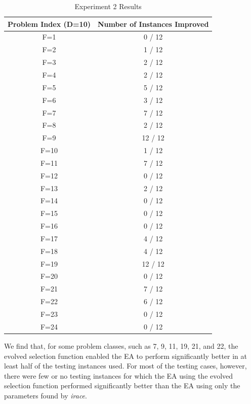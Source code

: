 \documentclass[sigconf]{acmart}
\begin{document}
\begin{table}
	\centering
	\caption{Experiment 2 Results}
	\label{tab:experiment2results}
	\begin{tabular}{c|c}
		\toprule
		Problem Index (D=10) & Number of Instances Improved \\
		\midrule
		F=1 & 0 / 12 \\
		\hline
		F=2 & 1 / 12 \\
		\hline
		F=3 & 2 / 12 \\
		\hline
		F=4 & 2 / 12 \\
		\hline
		F=5 & 5 / 12 \\
		\hline
		F=6 & 3 / 12 \\
		\hline
		F=7 & 7 / 12 \\
		\hline
		F=8 & 2 / 12 \\
		\hline
		F=9 & 12 / 12 \\
		\hline
		F=10 & 1 / 12 \\
		\hline
		F=11 & 7 / 12 \\
		\hline
		F=12 & 0 / 12 \\
		\hline
		F=13 & 2 / 12 \\
		\hline
		F=14 & 0 / 12 \\
		\hline
		F=15 & 0 / 12 \\
		\hline
		F=16 & 0 / 12 \\
		\hline
		F=17 & 4 / 12 \\
		\hline
		F=18 & 4 / 12 \\
		\hline
		F=19 & 12 / 12 \\
		\hline
		F=20 & 0 / 12 \\
		\hline
		F=21 & 7 / 12 \\
		\hline
		F=22 & 6 / 12 \\
		\hline
		F=23 & 0 / 12 \\
		\hline
		F=24 & 0 / 12 \\                       
		
		\bottomrule
	\end{tabular}
\end{table}

We find that, for some problem classes, such as 7, 9, 11, 19, 21, and 22, the evolved selection function enabled the EA to perform significantly better in at least half of the testing instances used. For most of the testing cases, however, there were few or no testing instances for which the EA using the evolved selection function performed significantly better than the EA using only the parameters found by \textit{irace}. 
\end{document}
